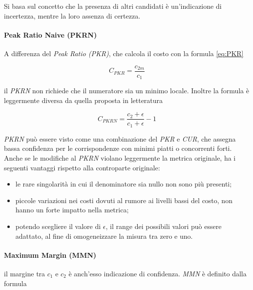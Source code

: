 \documentclass[12pt]{report}
\begin{document}
			Si basa sul concetto che la presenza di altri candidati è un'indicazione di incertezza, mentre la loro assenza di certezza.
			
			\paragraph{Peak Ratio Naive (PKRN)} 
			\label{par:PKRN}
		
				A differenza del \textit{Peak Ratio (PKR)}, che calcola il costo con la formula \ref{eq:PKR}
		
				\begin{equation}
					C_{PKR}=\frac{c_{2m}}{c_{1}}
					\label{eq:PKR}
				\end{equation}
			
				\noindent il \textit{PKRN} non richiede che il numeratore sia un minimo locale. Inoltre la formula è leggermente diversa da quella proposta in letteratura \cite{mercedes}
			
				\begin{equation}
					C_{PKRN}=\frac{c_{2} + \epsilon}{c_{1} + \epsilon} - 1
					\label{eq:PKRN}
				\end{equation}
		
				\noindent \textit{PKRN} può essere visto come una combinazione del \textit{PKR} e \textit{CUR}, che assegna bassa confidenza per le corrispondenze con minimi piatti o concorrenti forti. Anche se le modifiche al \textit{PKRN} violano leggermente la metrica originale, ha i seguenti vantaggi rispetto alla controparte originale:
				
				\begin{itemize}
					\item le rare singolarità in cui il denominatore sia nullo non sono più presenti;
					\item piccole variazioni nei costi dovuti al rumore ai livelli bassi del costo, non hanno un forte impatto nella metrica; 
					\item potendo scegliere il valore di $\epsilon$, il range dei possibili valori può essere adattato, al fine di omogeneizzare la misura tra zero e uno.
					\label{item:PKRN}			
				\end{itemize}
				
			\paragraph{Maximum Margin (MMN)}
			\label{par:MMN}
			
				il margine tra $c_{1}$ e $c_{2}$ è anch'esso indicazione di confidenza. \textit{MMN} è definito dalla formula
				
\end{document}

